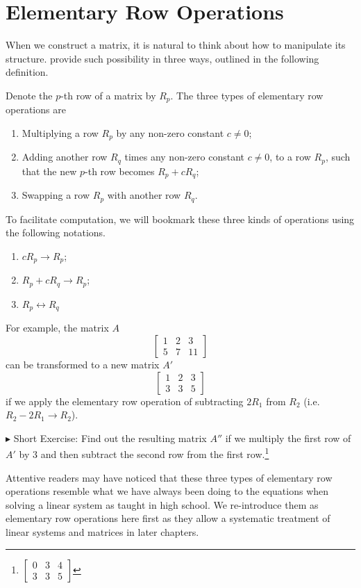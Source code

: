 \section{Elementary Row Operations}
When we construct a matrix, it is natural to think about how to manipulate its structure.  provide such possibility in three ways, outlined in the following definition.
\begin{defn}
\label{defn:elerowop}
Denote the $p$-th row of a matrix by $R_{p}$. The three types of elementary row operations are
\begin{enumerate}
\item Multiplying a row $R_{p}$ by any non-zero constant $c \neq 0$;
\item Adding another row $R_{q}$ times any non-zero constant $c \neq 0$, to a row $R_{p}$, such that the new $p$-th row becomes $R_{p} + cR_{q}$;
\item Swapping a row $R_{p}$ with another row $R_{q}$.
\end{enumerate}
To facilitate computation, we will bookmark these three kinds of operations using the following notations.
\begin{enumerate}
\item $cR_{p} \rightarrow R_{p}$;
\item $R_{p} + cR_{q} \rightarrow R_{p}$;
\item $R_{p} \leftrightarrow R_{q}$
\end{enumerate}
\end{defn}
For example, the matrix $A$
\begin{equation*}
\begin{bmatrix}
1 & 2 & 3 \\
5 & 7 & 11
\end{bmatrix}
\end{equation*}
can be transformed to a new matrix $A'$
\begin{equation*}
\begin{bmatrix}
1 & 2 & 3 \\
3 & 3 & 5
\end{bmatrix}
\end{equation*}
if we apply the elementary row operation of subtracting $2R_1$ from $R_2$  (i.e.\ $R_2 - 2R_1 \to R_2$). \par
$\blacktriangleright$ Short Exercise: Find out the resulting matrix $A''$ if we multiply the first row of $A'$ by $3$ and then subtract the second row from the first row.\footnote{
$\begin{bmatrix}
0 & 3 & 4 \\
3 & 3 & 5
\end{bmatrix}$}\par
Attentive readers may have noticed that these three types of elementary row operations resemble what we have always been doing to the equations when solving a linear system as taught in high school. We re-introduce them as elementary row operations here first as they allow a systematic treatment of linear systems and matrices in later chapters.

